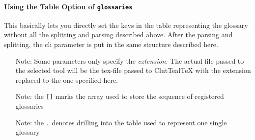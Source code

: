 \documentclass[a4paper, 11pt]{scrartcl}
\let\TeXold\TeX
\newcommand\CluttealTeX{ClutTeal\TeX\xspace}
\renewcommand\TeX{\TeXold\xspace}
\begin{document}
\paragraph{Using the Table Option of \texttt{glossaries}} \label{sec:glossary-table}
This basically lets you directly set the keys in the table representing the glossary without all the splitting and parsing described above.
After the parsing and splitting, the cli parameter is put in the same structure described here.

\begin{itemize}
	\item[Note:] Some parameters only specify the \emph{extension}.
		The actual file passed to the selected tool will be the tex-file passed to \CluttealTeX with the extension replaced to the one specified here.
	\item[Note:] the \texttt{[]} marks the array used to store the sequence of registered glossaries
	\item[Note:] the \texttt{.} denotes drilling into the table used to represent one single glossary
\end{itemize}
\end{document}

